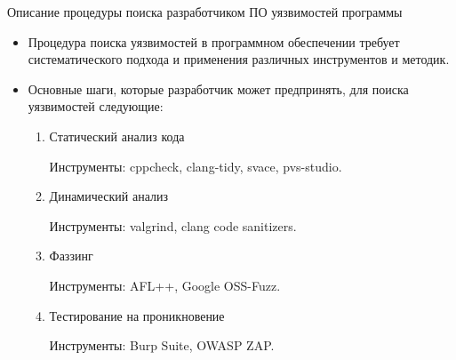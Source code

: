 \documentclass[10pt]{beamer}
\begin{document}
\begin{frame}{Описание процедуры поиска разработчиком ПО уязвимостей программы}
    \begin{itemize}
        \item Процедура поиска уязвимостей в программном обеспечении требует систематического подхода и применения различных инструментов и методик.

        \item Основные шаги, которые разработчик может предпринять, для поиска уязвимостей следующие:

        \begin{enumerate}
            \item Статический анализ кода

            Инструменты: cppcheck, clang-tidy, svace, pvs-studio.

            \item Динамический анализ

            Инструменты: valgrind, clang code sanitizers.

            \item Фаззинг

            Инструменты: AFL++, Google OSS-Fuzz.

            \item Тестирование на проникновение

            Инструменты: Burp Suite, OWASP ZAP.

        \end{enumerate}
    \end{itemize}
\end{frame}
\end{document}
